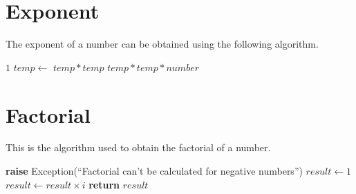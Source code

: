 \documentclass{report}
\begin{document}
\section{Exponent}
The exponent of a number can be obtained using the following algorithm.
\break
\begin{algorithmic}[1]
        \State \Return $1$
    \EndIf
    \State $temp \gets$ 
        \State \Return $temp * temp$
    \Else
        \State \Return $temp * temp * number$
    \EndIf
\EndFunction
\end{algorithmic}

\section{Factorial}
This is the algorithm used to obtain the factorial of a number.
\break
\begin{algorithmic}[1]
    \State \textbf{raise} Exception(``Factorial can't be calculated for negative numbers'')
  \EndIf
  \State $result \gets 1$
    \State $result \gets result \times i$
  \EndFor
  \State \textbf{return} $result$
\EndFunction
\end{algorithmic}
\end{document}
